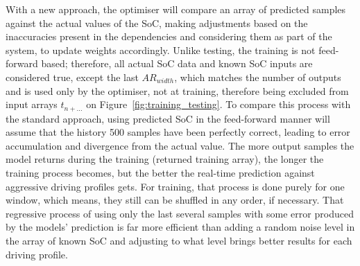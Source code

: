 %
%
With a new approach, the optimiser will compare an array of predicted samples against the actual values of the SoC, making adjustments based on the inaccuracies present in the dependencies and considering them as part of the system, to update weights accordingly.
Unlike testing, the training is not feed-forward based; therefore, all actual SoC data and known SoC inputs are considered true, except the last $AR_{width}$, which matches the number of outputs and is used only by the optimiser, not at training, therefore being excluded from input arrays $t_{n+...}$ on Figure~\ref{fig:training_testing}.
To compare this process with the standard approach, using predicted SoC in the feed-forward manner will assume that the history 500 samples have been perfectly correct, leading to error accumulation and divergence from the actual value.
The more output samples the model returns during the training (returned training array), the longer the training process becomes, but the better the real-time prediction against aggressive driving profiles gets.
For training, that process is done purely for one window, which means, they still can be shuffled in any order, if necessary.
That regressive process of using only the last several samples with some error produced by the models' prediction is far more efficient than adding a random noise level in the array of known SoC and adjusting to what level brings better results for each driving profile.
